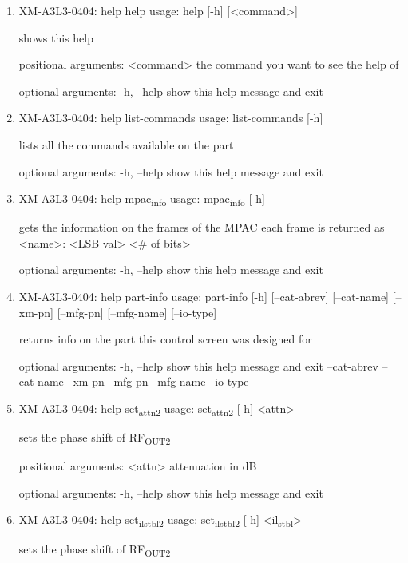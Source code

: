 \documentclass[11pt]{article}
\begin{document}
\begin{enumerate}
\item XM-A3L3-0404: help help
\label{sec:org0171f4e}
usage: help [-h] [<command>]

shows this help

positional arguments:
  <command>   the command you want to see the help of

optional arguments:
  -h, --help  show this help message and exit

\item XM-A3L3-0404: help list-commands
\label{sec:org387b2e7}
usage: list-commands [-h]

lists all the commands available on the part

optional arguments:
  -h, --help  show this help message and exit

\item XM-A3L3-0404: help mpac\textsubscript{info}
\label{sec:orga5d8dce}
usage: mpac\textsubscript{info} [-h]

gets the information on the frames of the MPAC each frame is returned as
<name>: <LSB val> <\# of bits>

optional arguments:
  -h, --help  show this help message and exit

\item XM-A3L3-0404: help part-info
\label{sec:orgbc5fcb5}
usage: part-info  [-h] [--cat-abrev] [--cat-name] [--xm-pn] [--mfg-pn] [--mfg-name]
        [--io-type]

returns info on the part this control screen was designed for

optional arguments:
  -h, --help   show this help message and exit
  --cat-abrev
  --cat-name
  --xm-pn
  --mfg-pn
  --mfg-name
  --io-type

\item XM-A3L3-0404: help set\textsubscript{attn}\textsubscript{2}
\label{sec:org49ccf58}
usage: set\textsubscript{attn}\textsubscript{2} [-h] <attn>

sets the phase shift of RF\textsubscript{OUT2}

positional arguments:
  <attn>      attenuation in dB

optional arguments:
  -h, --help  show this help message and exit

\item XM-A3L3-0404: help set\textsubscript{il}\textsubscript{stbl}\textsubscript{2}
\label{sec:org47f962c}
usage: set\textsubscript{il}\textsubscript{stbl}\textsubscript{2} [-h] <il\textsubscript{stbl}>

sets the phase shift of RF\textsubscript{OUT2}


\end{enumerate}
\end{document}
